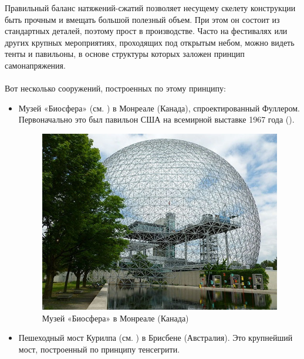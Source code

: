 Правильный баланс натяжений-сжатий позволяет несущему скелету конструкции быть прочным и вмещать большой полезный объем. При этом он состоит из стандартных деталей, поэтому прост в производстве. Часто на фестивалях или других крупных мероприятиях, проходящих под открытым небом, можно видеть тенты и павильоны, в основе структуры которых заложен принцип самонапряжения.\\\\
\clearpage
Вот несколько сооружений, построенных по этому принципу:

\begin{itemize}
	\item Музей «Биосфера» (см. \href{http://en.wikipedia.org/wiki/Montreal_Biosph\%C3\%A8re}{}) в Монреале (Канада), спроектированный Фуллером. Первоначально это был павильон США на всемирной выставке 1967 года (\href{http://en.wikipedia.org/wiki/Expo_67}{}).
	
	\begin{figure}[h!]
		\begin{center}
			\includegraphics[width=0.84\linewidth]{chapters/chapter19/images/4}
			\caption{Музей «Биосфера» в Монреале (Канада)}
			\label{ris:image19x4}
		\end{center}
	\end{figure}
	
	\item Пешеходный мост Курилпа (см. \href{http://en.wikipedia.org/wiki/Kurilpa_Bridge}{}) в Брисбене (Австралия). Это крупнейший мост, построенный по принципу тенсегрити.
	

\end{itemize}
